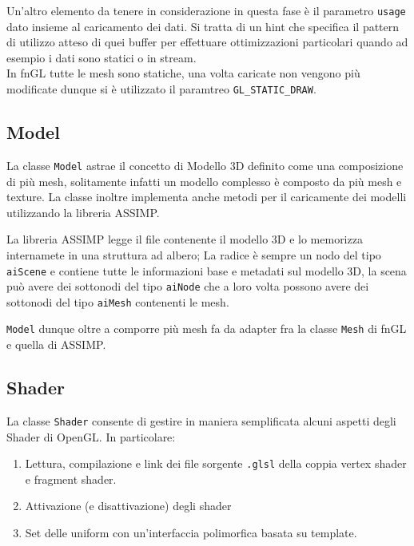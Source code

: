 Un'altro elemento da tenere in considerazione in questa fase è il parametro \texttt{usage} dato insieme al caricamento dei dati. Si tratta di un hint che specifica il pattern di utilizzo atteso di quei buffer per effettuare ottimizzazioni particolari quando ad esempio i dati sono statici o in stream.
\\
In fnGL tutte le mesh sono statiche, una volta caricate non vengono più modificate dunque si è utilizzato il paramtreo \texttt{GL\_STATIC\_DRAW}.


\subsection{Model}
La classe \texttt{Model} astrae il concetto di Modello 3D definito come una composizione di più mesh, solitamente infatti un modello complesso è composto da più mesh e texture. La classe inoltre implementa anche metodi per il caricamente dei modelli utilizzando la libreria ASSIMP.

La libreria ASSIMP legge il file contenente il modello 3D e lo memorizza internamete in una struttura ad albero; La radice è sempre un nodo del tipo \texttt{aiScene} e contiene tutte le informazioni base e metadati sul modello 3D, la scena può avere dei sottonodi del tipo \texttt{aiNode} che a loro volta possono avere dei sottonodi del tipo \texttt{aiMesh} contenenti le mesh.

\texttt{Model} dunque oltre a comporre più mesh fa da adapter fra la classe \texttt{Mesh} di fnGL e quella di ASSIMP.

\subsection{Shader}
La classe \texttt{Shader} consente di gestire in maniera semplificata alcuni aspetti degli Shader di OpenGL. In particolare:
\begin{enumerate}
	\item Lettura, compilazione e link dei file sorgente \texttt{.glsl} della coppia vertex shader e fragment shader.
	\item Attivazione (e disattivazione) degli shader
	\item Set delle uniform con un'interfaccia polimorfica basata su template.
\end{enumerate}

